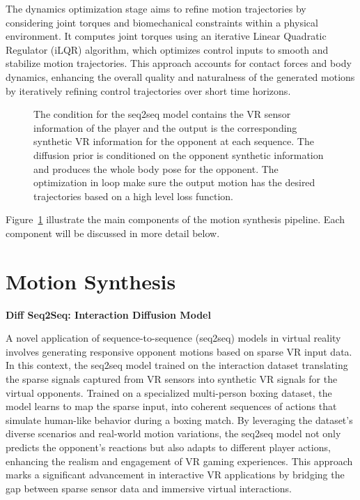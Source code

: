 \documentclass{egpubl}
\begin{document}
The dynamics optimization stage aims to refine motion trajectories by considering joint torques and biomechanical constraints within a physical environment. It computes joint torques using an iterative Linear Quadratic Regulator (iLQR) algorithm, which optimizes control inputs to smooth and stabilize motion trajectories. This approach accounts for contact forces and body dynamics, enhancing the overall quality and naturalness of the generated motions by iteratively refining control trajectories over short time horizons.

\begin{figure}[htbp]
  \centering

  

  \caption{\label{fig:condtion-diffusion}
           The condition for the seq2seq model contains the VR sensor information of the player and the output is the corresponding synthetic VR information for the opponent at each sequence. The diffusion prior is conditioned on the opponent synthetic information and produces the whole body pose for the opponent. The optimization in loop make sure the output motion has the desired trajectories based on a high level loss function.}
\end{figure}

Figure~\ref{fig:condtion-diffusion} illustrate the main components of the motion synthesis pipeline. Each component will be discussed in more detail below.



\section{Motion Synthesis}
\textbf{Diff Seq2Seq: Interaction Diffusion Model}
 
A novel application of sequence-to-sequence (seq2seq) models in virtual reality involves generating responsive opponent motions based on sparse VR input data. In this context, the seq2seq model trained on the interaction dataset translating the sparse signals captured from VR sensors into synthetic VR signals for the virtual opponents. Trained on a specialized multi-person boxing dataset, the model learns to map the sparse input, into coherent sequences of actions that simulate human-like behavior during a boxing match. By leveraging the dataset’s diverse scenarios and real-world motion variations, the seq2seq model not only predicts the opponent’s reactions but also adapts to different player actions, enhancing the realism and engagement of VR gaming experiences. This approach marks a significant advancement in interactive VR applications by bridging the gap between sparse sensor data and immersive virtual interactions.
\end{document}
